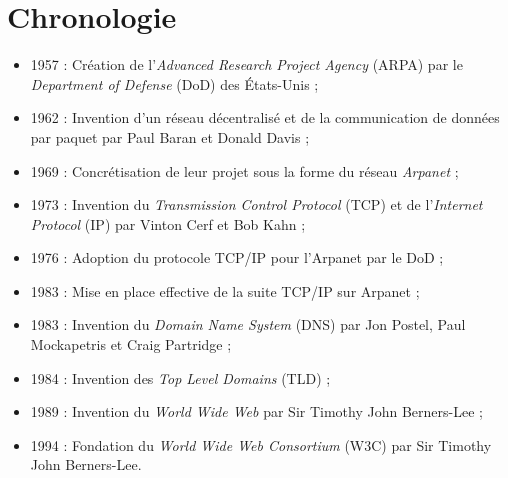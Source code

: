 \section{Chronologie}
\label{chronology}

\begin{itemize}
    \item 1957 : Création de l'\emph{Advanced Research Project Agency} (ARPA) par le \emph{Department of Defense} (DoD) des États-Unis ;
    \item 1962 : Invention d'un réseau décentralisé et de la communication de données par paquet par Paul Baran et Donald Davis ;
    \item 1969 : Concrétisation de leur projet sous la forme du réseau \emph{Arpanet} ;
    \item 1973 : Invention du \emph{Transmission Control Protocol} (TCP) et de l'\emph{Internet Protocol} (IP) par Vinton Cerf et Bob Kahn ;
    \item 1976 : Adoption du protocole TCP/IP pour l'Arpanet par le DoD ;
    \item 1983 : Mise en place effective de la suite TCP/IP sur Arpanet ;
    \item 1983 : Invention du \emph{Domain Name System} (DNS) par Jon Postel, Paul Mockapetris et Craig Partridge ;
    \item 1984 : Invention des \emph{Top Level Domains} (TLD) ;
    \item 1989 : Invention du \emph{World Wide Web} par Sir Timothy John Berners-Lee ;
    \item 1994 : Fondation du \emph{World Wide Web Consortium} (W3C) par Sir Timothy John Berners-Lee.
\end{itemize}